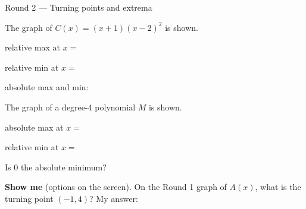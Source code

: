 \begin{notesbox}{Round 2 --- Turning points and extrema}
\vspace{6pt}
\begin{minipage}[t]{0.62\linewidth}
\vspace{0pt}
\; The graph of $C(x)=(x+1)(x-2)^2$ is shown.

\vspace{6pt}
relative max  at $x=$ 

\vspace{6pt}
relative min  at $x=$ 

\vspace{6pt}
absolute max and min: 
\end{minipage}\hfill
\begin{minipage}[t]{0.34\linewidth}
\vspace{0pt}\centering
\gC[0.40]
\end{minipage}

\vspace{6pt}
\begin{minipage}[t]{0.62\linewidth}
\vspace{0pt}
\; The graph of a degree-4 polynomial $M$ is shown.

\vspace{6pt}
absolute max  at $x=$ 

\vspace{6pt}
relative min  at $x=$ 

\vspace{6pt}
Is $0$ the absolute minimum? 
\end{minipage}\hfill
\begin{minipage}[t]{0.34\linewidth}
\vspace{0pt}\centering
\gM[0.36]
\end{minipage}

\vspace{8pt}
\textbf{Show me} (options on the screen). On the Round 1 graph of $A(x)$, what is the turning
point $(-1,4)$? \quad My answer: 
\end{notesbox}


